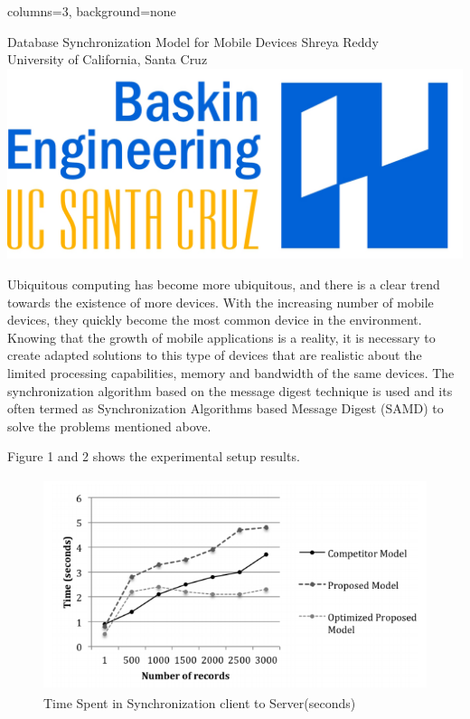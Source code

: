 \documentclass[portrait, paperwidth=91cm, paperheight=121cm, fontscale=0.35]{baposter}
\begin{document}
\begin{poster}{columns=3, background=none}

{Database Synchronization Model for Mobile Devices}
{Shreya Reddy\\University of California, Santa Cruz}
{\includegraphics[scale=0.9]{baskin.jpg}}

{Ubiquitous computing has become more ubiquitous, and there is a clear trend towards the existence of more devices. With the increasing number of mobile devices, they quickly become the most common device in the environment. Knowing that the growth of mobile applications is a reality, it is necessary to create adapted solutions to this type of devices that are realistic about the limited processing capabilities, memory and bandwidth of the same devices. The synchronization algorithm based on the message digest technique is used and its often termed as Synchronization Algorithms based Message Digest (SAMD) to solve the problems mentioned above.
}

{Figure 1 and 2 shows the experimental setup results.
  
    \begin{figure}[H]  
     \centering
     \includegraphics[height=6.2cm, width=\textwidth]{graph1.png}
     \caption{Time Spent in Synchronization client to Server(seconds)}\label{graph1}
     \end{figure}
     
}
\end{poster}
\end{document}
